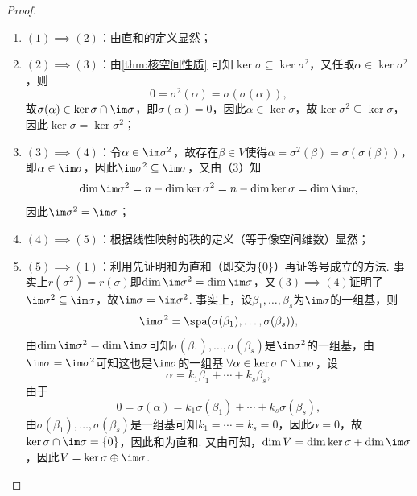 \begin{enumerate}
          \begin{proof}
              \begin{enumerate}
                  \item $(1)\implies(2)$：由直和的定义显然；

                  \item $(2)\implies(3)$：由\autoref{thm:核空间性质} 可知$\ker\sigma\subseteq\ker\sigma^2$，又任取$\alpha\in\ker\sigma^2$，则
                        \[0=\sigma^2(\alpha)=\sigma(\sigma(\alpha)),\]故$\sigma(\alpha)\in\ker\sigma\cap\im\sigma$，即$\sigma(\alpha)=0$，因此$\alpha\in\ker\sigma$，故$\ker\sigma^2\subseteq\ker\sigma$，因此$\ker\sigma=\ker\sigma^2$；

                  \item $(3)\implies(4)$：令$\alpha\in\im\sigma^2$，故存在$\beta\in V$使得$\alpha=\sigma^2(\beta)=\sigma(\sigma(\beta))$，即$\alpha\in\im\sigma$，因此$\im\sigma^2\subseteq\im\sigma$，又由（3）知
                        \[\dim\im\sigma^2=n-\dim\ker\sigma^2=n-\dim\ker\sigma=\dim\im\sigma,\]
                        因此$\im\sigma^2=\im\sigma$；

                  \item $(4)\implies(5)$：根据线性映射的秩的定义（等于像空间维数）显然；

                  \item $(5)\implies(1)$：利用先证明和为直和（即交为$\{0\}$）再证等号成立的方法. 事实上$r(\sigma^2)=r(\sigma)$即$\dim\im\sigma^2=\dim\im\sigma$，又$(3)\implies(4)$证明了$\im\sigma^2\subseteq\im\sigma$，故$\im \sigma=\im \sigma^2$. 事实上，设$\beta_1,\ldots,\beta_s$为$\im\sigma$的一组基，则
                        \[\im\sigma^2=\spa(\sigma(\beta_1),\ldots,\sigma(\beta_s)),\]
                        由$\dim\im\sigma^2=\dim\im\sigma$可知$\sigma(\beta_1),\ldots,\sigma(\beta_s)$是$\im\sigma^2$的一组基，由$\im \sigma=\im \sigma^2$可知这也是$\im\sigma$的一组基$. \forall\alpha\in\ker\sigma\cap\im\sigma$，设
                        \[\alpha=k_1\beta_1+\cdots+k_s\beta_s,\]
                        由于
                        \[0=\sigma(\alpha)=k_1\sigma(\beta_1)+\cdots+k_s\sigma(\beta_s),\]
                        由$\sigma(\beta_1),\ldots,\sigma(\beta_s)$是一组基可知$k_1=\cdots=k_s=0$，因此$\alpha=0$，故$\ker\sigma\cap\im\sigma=\{0\}$，因此和为直和. 又由可知，$\dim V=\dim\ker\sigma+\dim\im \sigma$，因此$V=\ker\sigma\oplus\im \sigma$.
              \end{enumerate}
          \end{proof}


\end{enumerate}

